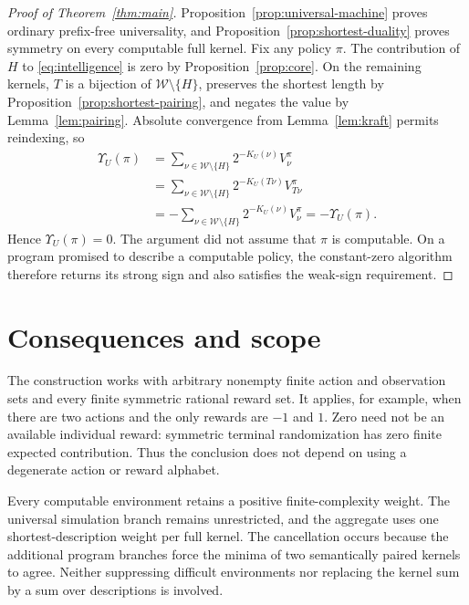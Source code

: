 \documentclass[11pt]{article}
\theoremstyle{definition}
\theoremstyle{remark}
\newcommand{\W}{\mathcal W}
\begin{document}
\begin{proof}[Proof of Theorem~\ref{thm:main}]
Proposition~\ref{prop:universal-machine} proves ordinary
prefix-free universality, and
Proposition~\ref{prop:shortest-duality} proves symmetry on every
computable full kernel.  Fix any policy $\pi$.  The contribution
of $H$ to \eqref{eq:intelligence} is zero by
Proposition~\ref{prop:core}.  On the remaining kernels, $T$ is a
bijection of $\W\setminus\{H\}$, preserves the shortest length
by Proposition~\ref{prop:shortest-pairing}, and negates the value
by Lemma~\ref{lem:pairing}.  Absolute convergence from
Lemma~\ref{lem:kraft} permits reindexing, so
\begin{align*}
  \Upsilon_U(\pi)
   &=\sum_{\nu\in\W\setminus\{H\}}
         2^{-K_U(\nu)}V_\nu^\pi\\
   &=\sum_{\nu\in\W\setminus\{H\}}
         2^{-K_U(T\nu)}V_{T\nu}^\pi\\
   &=-\sum_{\nu\in\W\setminus\{H\}}
         2^{-K_U(\nu)}V_\nu^\pi
    =-\Upsilon_U(\pi).
\end{align*}
Hence $\Upsilon_U(\pi)=0$.  The argument did not assume that
$\pi$ is computable.  On a program promised to describe a
computable policy, the constant-zero algorithm therefore returns
its strong sign and also satisfies the weak-sign requirement.
\end{proof}

\section{Consequences and scope}
\label{sec:scope}

The construction works with arbitrary nonempty finite action and
observation sets and every finite symmetric rational reward set.
It applies, for example, when there are two actions and the only
rewards are $-1$ and $1$.  Zero need not be an available individual
reward: symmetric terminal randomization has zero finite expected
contribution.  Thus the conclusion does not depend on using a
degenerate action or reward alphabet.

Every computable environment retains a positive finite-complexity
weight.  The universal simulation branch remains unrestricted, and
the aggregate uses one shortest-description weight per full kernel.
The cancellation occurs because the additional program branches
force the minima of two semantically paired kernels to agree.
Neither suppressing difficult environments nor replacing the kernel
sum by a sum over descriptions is involved.
\end{document}
